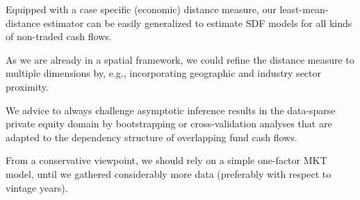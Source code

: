 \documentclass[12pt]{article}
\begin{document}
Equipped with a case specific (economic) distance measure, our least-mean-distance estimator can be easily generalized to estimate SDF models for all kinds of non-traded cash flows.

As we are already in a spatial framework, we could refine the distance measure to multiple dimensions by, e.g., incorporating geographic and industry sector proximity.

We advice to always challenge asymptotic inference results in the data-sparse private equity domain by bootstrapping or cross-validation analyses that are adapted to the dependency structure of overlapping fund cash flows.

From a conservative viewpoint, we should rely on a simple one-factor MKT model, until we gathered considerably more data (preferably with respect to vintage years).










\newpage
\end{document}
